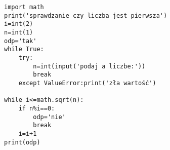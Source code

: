 \begin{verbatim}
import math
print('sprawdzanie czy liczba jest pierwsza')
i=int(2)
n=int(1)
odp='tak'
while True:
    try:
        n=int(input('podaj a liczbe:'))
        break   
    except ValueError:print('zła wartość')

while i<=math.sqrt(n):
    if n%i==0:
        odp='nie'
        break
    i=i+1
print(odp)
\end{verbatim}